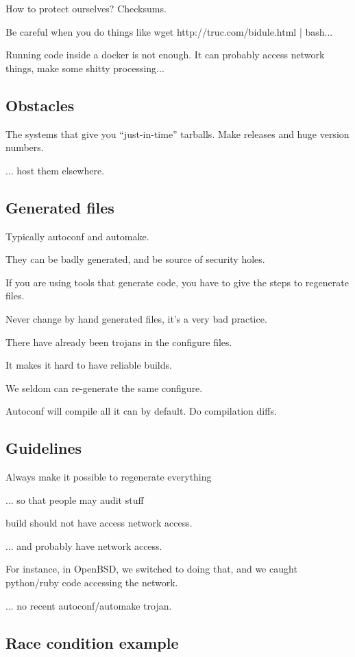\documentclass[a4paper,11pt]{article}
\begin{document}
How to protect ourselves? Checksums.

Be careful when you do things like wget http://truc.com/bidule.html | bash...

Running code inside a docker is not enough. It can probably access network
things, make some shitty processing...

\subsection{Obstacles}

The systems that give you ``just-in-time'' tarballs. Make releases and huge
version numbers.

... host them elsewhere.

\subsection{Generated files}

Typically autoconf and automake.

They can be badly generated, and be source of security holes.

If you are using tools that generate code, you have to give the steps to
regenerate files.

Never change by hand generated files, it's a very bad practice.

There have already been trojans in the configure files.

It makes it hard to have reliable builds.

We seldom can re-generate the same configure.

Autoconf will compile all it can by default. Do compilation diffs.

\subsection{Guidelines}

Always make it possible to regenerate everything

... so that people may audit stuff

build should not have access network access.

... and probably have network access.

For instance, in OpenBSD, we switched to doing that, and we caught python/ruby
code accessing the network.


... no recent autoconf/automake trojan.

\subsection{Race condition example}
\end{document}
